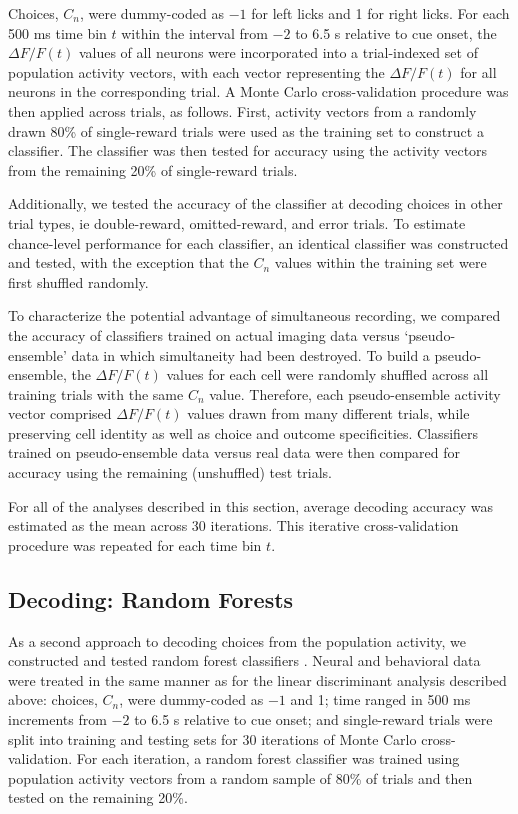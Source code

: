 Choices, $C_n$, were dummy-coded as $-1$ for left licks and 1 for right licks. For each 500 ms time bin $t$ within the interval from $-2$ to 6.5 s relative to cue onset, the $\Delta F/F(t)$ values of all neurons were incorporated into a trial-indexed set of population activity vectors, with each vector representing the $\Delta F/F(t)$ for all neurons in the corresponding trial. A Monte Carlo cross-validation procedure was then applied across trials, as follows. First, activity vectors from a randomly drawn 80\% of single-reward trials were used as the training set to construct a classifier. The classifier was then tested for accuracy using the activity vectors from the remaining 20\% of single-reward trials. 

Additionally, we tested the accuracy of the classifier at decoding choices in other trial types, ie double-reward, omitted-reward, and error trials. To estimate chance-level performance for each classifier, an identical classifier was constructed and tested, with the exception that the $C_n$ values within the training set were first shuffled randomly. 

To characterize the potential advantage of simultaneous recording, we compared the accuracy of classifiers trained on actual imaging data versus ‘pseudo-ensemble’ data in which simultaneity had been destroyed. To build a pseudo-ensemble, the $\Delta F/F(t)$  values for each cell were randomly shuffled across all training trials with the same $C_n$ value. Therefore, each pseudo-ensemble activity vector comprised $\Delta F/F(t)$  values drawn from many different trials, while preserving cell identity as well as choice and outcome specificities. Classifiers trained on pseudo-ensemble data versus real data were then compared for accuracy using the remaining (unshuffled) test trials. 

For all of the analyses described in this section, average decoding accuracy was estimated as the mean across 30 iterations. This iterative cross-validation procedure was repeated for each time bin $t$.

\subsection*{Decoding: Random Forests}
As a second approach to decoding choices from the population activity, we constructed and tested random forest classifiers \citep{breiman2001random}. Neural and behavioral data were treated in the same manner as for the linear discriminant analysis described above: choices, $C_n$, were dummy-coded as $-1$ and 1; time ranged in 500 ms increments from $-2$ to 6.5 s relative to cue onset; and single-reward trials were split into training and testing sets for 30 iterations of Monte Carlo cross-validation. For each iteration, a random forest classifier was trained using population activity vectors from a random sample of 80\% of trials and then tested on the remaining 20\%. 

